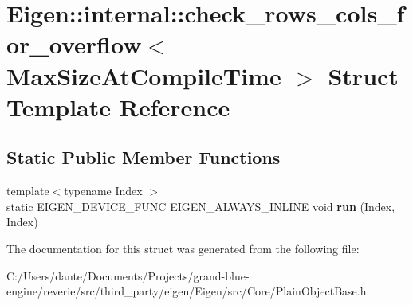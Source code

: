 \hypertarget{struct_eigen_1_1internal_1_1check__rows__cols__for__overflow}{}\section{Eigen\+::internal\+::check\+\_\+rows\+\_\+cols\+\_\+for\+\_\+overflow$<$ Max\+Size\+At\+Compile\+Time $>$ Struct Template Reference}
\label{struct_eigen_1_1internal_1_1check__rows__cols__for__overflow}
\subsection*{Static Public Member Functions}
\begin{DoxyCompactItemize}
\item 
\mbox{\label{struct_eigen_1_1internal_1_1check__rows__cols__for__overflow_a96aadd23e6335d10018576e81dec4443}} 
{\footnotesize template$<$typename Index $>$ }\\static E\+I\+G\+E\+N\+\_\+\+D\+E\+V\+I\+C\+E\+\_\+\+F\+U\+NC E\+I\+G\+E\+N\+\_\+\+A\+L\+W\+A\+Y\+S\+\_\+\+I\+N\+L\+I\+NE void {\bfseries run} (Index, Index)
\end{DoxyCompactItemize}


The documentation for this struct was generated from the following file\+:\begin{DoxyCompactItemize}
\item 
C\+:/\+Users/dante/\+Documents/\+Projects/grand-\/blue-\/engine/reverie/src/third\+\_\+party/eigen/\+Eigen/src/\+Core/Plain\+Object\+Base.\+h\end{DoxyCompactItemize}
